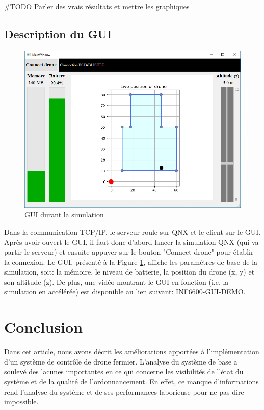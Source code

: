 \documentclass[journal]{IEEEtran}
\begin{document}
\#TODO Parler des vrais résultats et mettre les graphiques


\subsection{Description du GUI}
\begin{figure}
	\centering
	\captionsetup{justification=centering}
	\includegraphics[width=\linewidth]{GUI_image.png}
	\caption{GUI durant la simulation}
	\label{fig:GUI}
\end{figure}

Dans la communication TCP/IP, le serveur roule sur QNX et le client sur le GUI. Après avoir ouvert le GUI, il faut donc d'abord lancer la simulation QNX (qui va partir le serveur) et ensuite appuyer sur le bouton "Connect drone" pour établir la connexion. Le GUI, présenté à la Figure \ref{fig:GUI}, affiche les paramètres de base de la simulation, soit: la mémoire, le niveau de batterie, la position du drone (x, y) et son altitude (z). De plus, une vidéo montrant le GUI en fonction (i.e. la simulation en accélérée) est disponible au lien suivant: \href{https://drive.google.com/file/d/1W9yt0Z4YxCwr0TjXkgv12WVO9TSmWGtv/view?usp=sharing}{INF6600-GUI-DEMO}.


\section{Conclusion}
Dans cet article, nous avons décrit les améliorations apportées à l'implémentation d'un système de contrôle de drone fermier. L'analyse du système de base a soulevé des lacunes importantes en ce qui concerne les visibilités de l'état du système et de la qualité de l'ordonnancement. En effet, ce manque d'informations rend l'analyse du système et de ses performances laborieuse pour ne pas dire impossible. 
\end{document}
